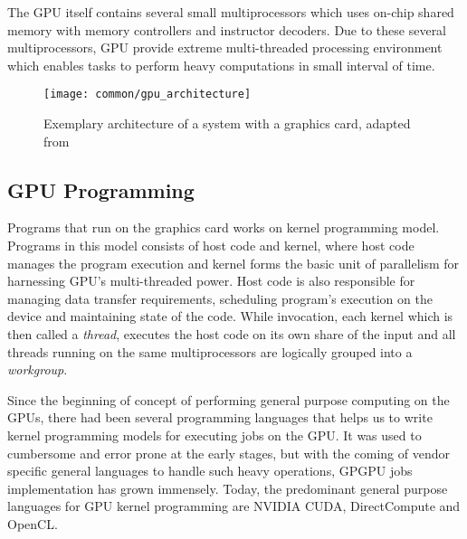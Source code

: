 The GPU itself contains several small multiprocessors which uses on-chip shared memory with memory controllers and instructor decoders. Due to these several multiprocessors, GPU provide extreme multi-threaded processing environment which enables tasks to perform heavy computations in small interval of time.
\begin{figure}[ht]
\centering
\texttt{[image: common/gpu\_architecture]}
\caption{Exemplary architecture of a system with a graphics card, adapted from \cite{gpu_architecture}}
\label{fig:gpu_arch}
\end{figure}

\subsection*{GPU Programming}
Programs that run on the graphics card works on kernel programming model. Programs in this model consists of host code and kernel\cite{gpu_architecture}, where host code manages the program execution and kernel forms the basic unit of parallelism for harnessing GPU's multi-threaded power. Host code is also responsible for managing data transfer requirements, scheduling program's execution on the device and maintaining state of the code. While invocation, each kernel which is then called a \emph{thread}, executes the host code on its own share of the input and all threads running on the same multiprocessors are logically grouped into a \emph{workgroup}.

Since the beginning of concept of performing general purpose computing on the GPUs, there had been several programming languages that helps us to write kernel programming models for executing jobs on the GPU. It was used to cumbersome and error prone at the early stages, but with the coming of vendor specific general languages to handle such heavy operations, GPGPU jobs implementation has grown immensely. Today, the predominant general purpose languages for GPU kernel programming are NVIDIA CUDA, DirectCompute and OpenCL.
